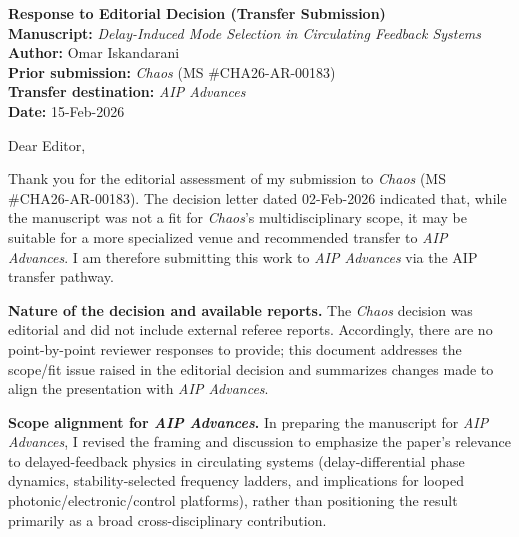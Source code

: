 \documentclass[11pt]{article}
\begin{document}
    \begin{center}
        {\Large \textbf{Response to Editorial Decision (Transfer Submission)}}\\[0.35em]
        \textbf{Manuscript:} \emph{Delay-Induced Mode Selection in Circulating Feedback Systems}\\
        \textbf{Author:} Omar Iskandarani\\
        \textbf{Prior submission:} \emph{Chaos} (MS \#CHA26-AR-00183)\\
        \textbf{Transfer destination:} \emph{AIP Advances}\\
        \textbf{Date:} 15-Feb-2026
    \end{center}

    \vspace{0.75em}

    \noindent Dear Editor,

    \medskip
    \noindent Thank you for the editorial assessment of my submission to \emph{Chaos} (MS \#CHA26-AR-00183).
    The decision letter dated 02-Feb-2026 indicated that, while the manuscript was not a fit for \emph{Chaos}'s
    multidisciplinary scope, it may be suitable for a more specialized venue and recommended transfer to
    \emph{AIP Advances}. I am therefore submitting this work to \emph{AIP Advances} via the AIP transfer pathway.

    \medskip
    \noindent \textbf{Nature of the decision and available reports.}
    The \emph{Chaos} decision was editorial and did not include external referee reports. Accordingly, there are no
    point-by-point reviewer responses to provide; this document addresses the scope/fit issue raised in the editorial
    decision and summarizes changes made to align the presentation with \emph{AIP Advances}.

    \medskip
    \noindent \textbf{Scope alignment for \emph{AIP Advances}.}
    In preparing the manuscript for \emph{AIP Advances}, I revised the framing and discussion to emphasize the paper's
    relevance to delayed-feedback physics in circulating systems (delay-differential phase dynamics, stability-selected
    frequency ladders, and implications for looped photonic/electronic/control platforms), rather than positioning the
    result primarily as a broad cross-disciplinary contribution.
\end{document}
